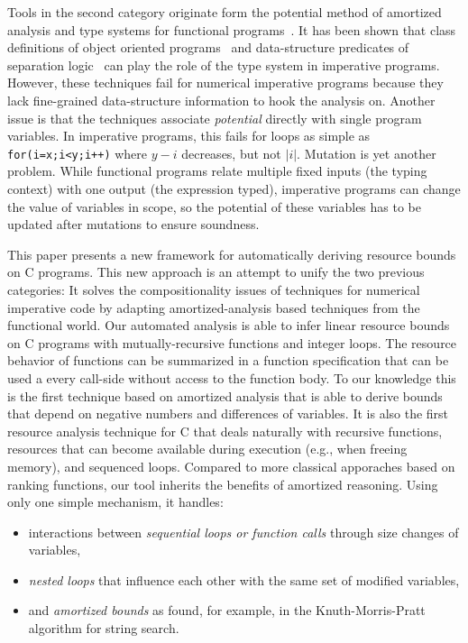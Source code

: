 \documentclass[nocopyrightspace,preprint]{sigplanconf}
\newcommand{\ifshort}[2]{\ifx\fullversion\undefined{#1}\else{#2}\fi}
\newcommand{\itemskipIn}[0]{\ifshort{\vspace{-1pt}}{}}
\begin{document}
Tools in the second category originate form the potential method of
amortized analysis and type systems for functional
programs~\cite{Jost03,HoffmannAH12}. It has been shown that class
definitions of object oriented programs~\cite{Jost06} and
data-structure predicates of separation logic~\cite{Atkey10} can play
the role of the type system in imperative programs. However, these
techniques fail for numerical imperative programs because they lack
fine-grained data-structure information to hook the analysis on.
Another issue is that the techniques associate \emph{potential}
directly with single program variables.  In imperative programs, this
fails for loops as simple as \lstinline{for(i=x;i<y;i++)} where
$y - i$ decreases, but not $|i|$.  Mutation is yet another problem.
While functional programs relate multiple fixed inputs (the typing
context) with one output (the expression typed), imperative programs
can change the value of variables in scope, so the potential of these
variables has to be updated after mutations to ensure soundness.

This paper presents a new framework for automatically
deriving resource bounds on C programs.  This new
approach is an attempt to unify the two previous
categories: It solves the compositionality issues of techniques
for numerical imperative code by adapting amortized-analysis based
techniques from the functional world.
%
Our automated analysis is able to infer linear
resource bounds on C programs with mutually-recursive functions and integer loops.
%
The resource behavior of functions can be summarized
in a function specification that can be used a every
call-side without access to the function body.
%
To our knowledge this is the first technique based on
amortized analysis that is able to derive bounds that depend on negative numbers
and differences of variables.  It is also the first
resource analysis technique for C that deals naturally with
recursive functions, resources that can become available during execution (e.g., when freeing
memory), and sequenced loops.  Compared to more classical
apporaches based on ranking functions, our tool inherits
the benefits of amortized reasoning.  Using only one
simple mechanism, it handles:

\begin{itemize}
\item interactions between \emph{sequential loops or
  function calls} through size changes of variables,
\itemskipIn
\item \emph{nested loops} that influence each other
  with the same set of modified variables,
\itemskipIn
\item and \emph{amortized bounds} as found, for example, in
  the Knuth-Morris-Pratt algorithm for string search.
\end{itemize}
\end{document}
